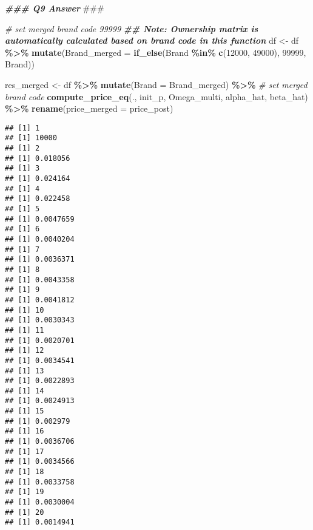 \documentclass[
]{article}
\newenvironment{Shaded}{\begin{snugshade}}{\end{snugshade}}
\newcommand{\AlertTok}[1]{\textcolor[rgb]{0.94,0.16,0.16}{#1}}
\newcommand{\AttributeTok}[1]{\textcolor[rgb]{0.13,0.29,0.53}{#1}}
\newcommand{\CommentTok}[1]{\textcolor[rgb]{0.56,0.35,0.01}{\textit{#1}}}
\newcommand{\DecValTok}[1]{\textcolor[rgb]{0.00,0.00,0.81}{#1}}
\newcommand{\DocumentationTok}[1]{\textcolor[rgb]{0.56,0.35,0.01}{\textbf{\textit{#1}}}}
\newcommand{\FunctionTok}[1]{\textcolor[rgb]{0.13,0.29,0.53}{\textbf{#1}}}
\newcommand{\NormalTok}[1]{#1}
\newcommand{\OtherTok}[1]{\textcolor[rgb]{0.56,0.35,0.01}{#1}}
\newcommand{\SpecialCharTok}[1]{\textcolor[rgb]{0.81,0.36,0.00}{\textbf{#1}}}
\begin{document}
\begin{Shaded}
\begin{Highlighting}[]
\DocumentationTok{\#\#\# Q9 Answer }\AlertTok{\#\#\#}

\CommentTok{\# set merged brand code 99999}
\DocumentationTok{\#\# Note: Ownership matrix is automatically calculated based on brand code in this function}
\NormalTok{df }\OtherTok{\textless{}{-}}\NormalTok{ df }\SpecialCharTok{\%\textgreater{}\%}
  \FunctionTok{mutate}\NormalTok{(}\AttributeTok{Brand\_merged =} \FunctionTok{if\_else}\NormalTok{(Brand }\SpecialCharTok{\%in\%} \FunctionTok{c}\NormalTok{(}\DecValTok{12000}\NormalTok{, }\DecValTok{49000}\NormalTok{), }\DecValTok{99999}\NormalTok{, Brand))}


\NormalTok{res\_merged }\OtherTok{\textless{}{-}}\NormalTok{ df }\SpecialCharTok{\%\textgreater{}\%}
  \FunctionTok{mutate}\NormalTok{(}\AttributeTok{Brand =}\NormalTok{ Brand\_merged) }\SpecialCharTok{\%\textgreater{}\%} \CommentTok{\# set merged brand code}
  \FunctionTok{compute\_price\_eq}\NormalTok{(., init\_p, Omega\_multi, alpha\_hat, beta\_hat) }\SpecialCharTok{\%\textgreater{}\%}
  \FunctionTok{rename}\NormalTok{(}\AttributeTok{price\_merged =}\NormalTok{ price\_post)}
\end{Highlighting}
\end{Shaded}

\begin{verbatim}
## [1] 1
## [1] 10000
## [1] 2
## [1] 0.018056
## [1] 3
## [1] 0.024164
## [1] 4
## [1] 0.022458
## [1] 5
## [1] 0.0047659
## [1] 6
## [1] 0.0040204
## [1] 7
## [1] 0.0036371
## [1] 8
## [1] 0.0043358
## [1] 9
## [1] 0.0041812
## [1] 10
## [1] 0.0030343
## [1] 11
## [1] 0.0020701
## [1] 12
## [1] 0.0034541
## [1] 13
## [1] 0.0022893
## [1] 14
## [1] 0.0024913
## [1] 15
## [1] 0.002979
## [1] 16
## [1] 0.0036706
## [1] 17
## [1] 0.0034566
## [1] 18
## [1] 0.0033758
## [1] 19
## [1] 0.0030004
## [1] 20
## [1] 0.0014941
\end{verbatim}
\end{document}
